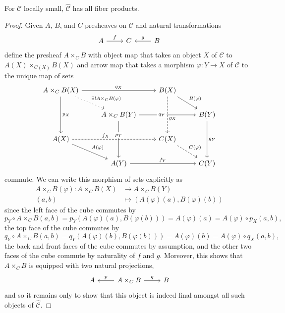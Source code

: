 \documentclass[10pt]{amsart}
\begin{document}
\begin{prop}
  For $\mathscr{C}$ locally small, $\hat{\mathscr{C}}$ has all fiber products.
  
  \begin{proof}
    Given $A$, $B$, and $C$ presheaves on $\mathscr{C}$ and natural transformations
    $$\begin{tikzcd}A \arrow{r}{f} & C & B \arrow[swap]{l}{g}\end{tikzcd}$$
    define the presheaf $A \times_C B$ with object map that takes an object $X$ of $\mathscr{C}$ to $A(X) \times_{C(X)} B(X)$ and arrow map that takes a morphism $\varphi : Y \rightarrow X$ of $\mathscr{C}$ to the unique map of sets
    $$\begin{tikzcd}
      A \times_{C} B(X) \arrow{rr}{q_X}\arrow{dd}{p_X} \arrow[dotted]{rd}{\exists !A \times_C B (\varphi)}& & B(X)\arrow[dashed]{dd}[pos=0.6]{g_X}\arrow{rd}{B(\varphi)}&\\
      & A \times_{C} B(Y)\arrow{dd}[description, pos=0.39]{p_Y} \arrow{rr}[pos=0.4,description]{q_Y} & & B(Y)\arrow{dd}{g_Y}\\
      A(X)\arrow{rd}{A(\varphi)}\arrow[dashed]{rr}[pos=0.4]{f_X} & & C(X)\arrow[dashed]{rd}{C(\varphi)} & \\
      & A(Y)\arrow{rr}{f_Y} & & C(Y)
    \end{tikzcd}$$
    commute.
    We can write this morphism of sets explicitly as
    \begin{align*}
      A \times_C B(\varphi) \colon A \times_C B(X) &\rightarrow A \times_C B (Y)\\
      (a,b) &\mapsto (A(\varphi)(a), B(\varphi)(b))
    \end{align*}
    since the left face of the cube commutes by
    $$p_Y \circ A \times_C B(a,b)  = p_Y(A(\varphi)(a), B(\varphi(b))) = A(\varphi)(a) = A(\varphi) \circ p_X(a,b),$$
    the top face of the cube commutes by
    $$q_Y \circ A \times_C B(a,b)  = q_Y(A(\varphi)(b), B(\varphi(b))) = A(\varphi)(b) = A(\varphi) \circ q_X(a,b),$$
    the back and front faces of the cube commutes by assumption, and the other two faces of the cube commute by naturality of $f$ and $g$.
    Moreover, this shows that $A \times_C B$ is equipped with two natural projections,
    $$\begin{tikzcd}
      A & A \times_C B \arrow{r}{q} \arrow[swap]{l}{p} & B
    \end{tikzcd}$$
    and so it remains only to show that this object is indeed final amongst all such objects of $\hat{\mathscr{C}}$.


\end{proof}
\end{prop}
\end{document}
